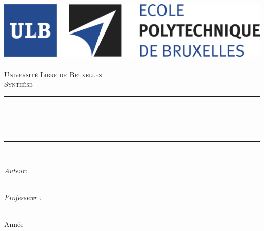 \AddToShipoutPicture*{\BackgroundPic}

\begin{titlepage}
	\begin{center}	
			
		\newcommand{\HRule}{\rule{\linewidth}{0.5mm}}   			            %
		\includegraphics[scale=0.11]{../../Builder/titlepage/logo.jpg}~\\[1cm]				%
			
			\textsc{\LARGE Université Libre de Bruxelles}\\[1.5cm]
			\textsc{\Large Synthèse}\\[0.5cm]
			
			\HRule \\[0.4cm]
			{ \huge \bfseries \cours \ \\\memo \\[0.4cm] }
			
			
			\HRule \\[1.5cm]
			\begin{minipage}{0.6\textwidth}
				\begin{flushleft}%
					\emph{Auteur:}\\
					\prenom~\textsc{\nom}\\
				\end{flushleft}
			\end{minipage}
			\begin{minipage}{0.25\textwidth}
				\emph{Professeur :}\\
				\pprenom~\textsc{\pnom}
			\end{minipage}
			
			\vfill
			
			{\large Année \adebut~-~\afin}
			
		\end{center}
	\end{titlepage}